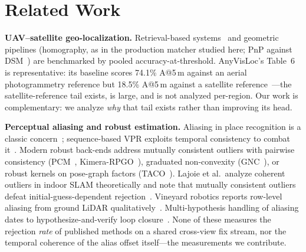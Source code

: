 \documentclass[journal]{IEEEtran}
\begin{document}
\section{Related Work}

\textbf{UAV--satellite geo-localization.} Retrieval-based systems~\cite{uavvisloc,anyvisloc,denseuav} and geometric pipelines (homography, as in the production matcher studied here; PnP against DSM~\cite{ortholoc,orthotrack}) are benchmarked by pooled accuracy-at-threshold. AnyVisLoc's Table~6 is representative: its baseline scores 74.1\% A@5\,m against an aerial photogrammetry reference but 18.5\% A@5\,m against a satellite reference~\cite{anyvisloc}---the satellite-reference tail exists, is large, and is not analyzed per-region. Our work is complementary: we analyze \emph{why} that tail exists rather than improving its head.

\textbf{Perceptual aliasing and robust estimation.} Aliasing in place recognition is a classic concern~\cite{lowry2016}; sequence-based VPR exploits temporal consistency to combat it~\cite{seqvpr}. Modern robust back-ends address mutually consistent outliers with pairwise consistency (PCM~\cite{mangelson2018}, Kimera-RPGO~\cite{kimera}), graduated non-convexity (GNC~\cite{yang2020}), or robust kernels on pose-graph factors (TACO~\cite{taco}). Lajoie et al.\ analyze coherent outliers in indoor SLAM theoretically and note that mutually consistent outliers defeat initial-guess-dependent rejection~\cite{lajoie2019}. Vineyard robotics reports row-level aliasing from ground LiDAR qualitatively~\cite{desilva2025,desilva2026,vineptmap}. Multi-hypothesis handling of aliasing dates to hypothesize-and-verify loop closure~\cite{tanaka2016}. None of these measures the rejection \emph{rate} of published methods on a shared cross-view fix stream, nor the temporal coherence of the alias offset itself---the measurements we contribute.
\end{document}
